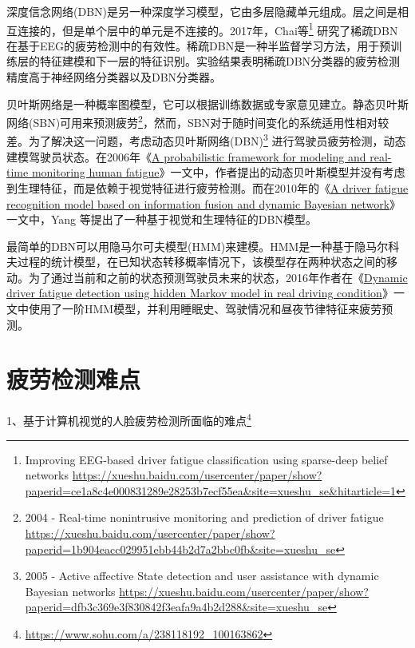 深度信念网络(DBN)是另一种深度学习模型，它由多层隐藏单元组成。层之间是相互连接的，但是单个层中的单元是不连接的。2017年，Chai等\footnote{Improving EEG-based driver fatigue classification using sparse-deep belief networks \quad \url{https://xueshu.baidu.com/usercenter/paper/show?paperid=ce1a8c4e000831289e28253b7ecf55ea&site=xueshu_se&hitarticle=1}} 研究了稀疏DBN在基于EEG的疲劳检测中的有效性。稀疏DBN是一种半监督学习方法，用于预训练层的特征建模和下一层的特征识别。实验结果表明稀疏DBN分类器的疲劳检测精度高于神经网络分类器以及DBN分类器。

贝叶斯网络是一种概率图模型，它可以根据训练数据或专家意见建立。静态贝叶斯网络(SBN)可用来预测疲劳\footnote{2004 - Real-time nonintrusive monitoring and
prediction of driver fatigue \quad \url{https://xueshu.baidu.com/usercenter/paper/show?paperid=1b904eacc029951ebb44b2d7a2bbc0fb&site=xueshu_se}}，然而，SBN对于随时间变化的系统适用性相对较差。为了解决这一问题，考虑动态贝叶斯网络(DBN)\footnote{2005 - Active affective State detection and user assistance
with dynamic Bayesian networks \quad \url{https://xueshu.baidu.com/usercenter/paper/show?paperid=dfb3c369e3f830842f3eafa9a4b2d288&site=xueshu_se}} 进行驾驶员疲劳检测，动态建模驾驶员状态。在2006年《\href{https://xueshu.baidu.com/usercenter/paper/show?paperid=6169446ab4e1e341d4e8b342f349b874&site=xueshu_se}{A probabilistic framework for modeling and real-time monitoring human fatigue}》一文中，作者提出的动态贝叶斯模型并没有考虑到生理特征，而是依赖于视觉特征进行疲劳检测。而在2010年的《\href{https://xueshu.baidu.com/usercenter/paper/show?paperid=77b329aa91601b793fd7bd3d22cbefa8&site=xueshu_se&hitarticle=1}{A driver fatigue recognition
model based on information fusion and dynamic Bayesian network}》一文中，Yang 等提出了一种基于视觉和生理特征的DBN模型。

最简单的DBN可以用隐马尔可夫模型(HMM)来建模。HMM是一种基于隐马尔科夫过程的统计模型，在已知状态转移概率情况下，该模型存在两种状态之间的移动。为了通过当前和之前的状态预测驾驶员未来的状态，2016年作者在《\href{https://xueshu.baidu.com/usercenter/paper/show?paperid=fbdc243ba7aa1adf749a692d9536fb44&site=xueshu_se}{Dynamic driver fatigue detection using
hidden Markov model in real driving condition}》一文中使用了一阶HMM模型，并利用睡眠史、驾驶情况和昼夜节律特征来疲劳预测。

\section{疲劳检测难点}

1、基于计算机视觉的人脸疲劳检测所面临的难点\footnote{\url{https://www.sohu.com/a/238118192_100163862}}

